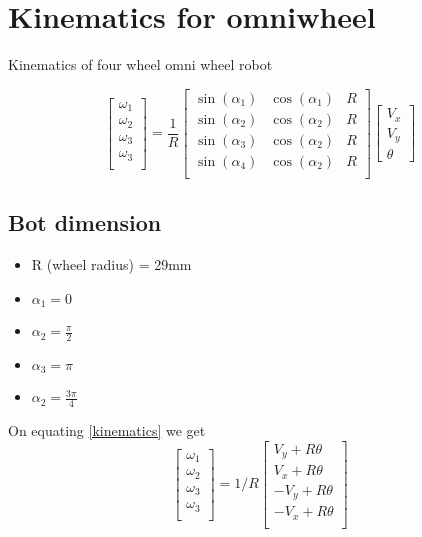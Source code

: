 \documentclass[a4paper]{article}
\begin{document}

\section{Kinematics for omniwheel }
Kinematics of four wheel omni wheel robot

\begin{equation}\label{kinematics}   
    \begin{bmatrix}
		\omega_1 \\
		\omega_2 \\
		\omega_3 \\
		\omega_3 \\
	\end{bmatrix}
	=\frac{1}{R}
	\begin{bmatrix}
		\sin(\alpha_1) & \cos(\alpha_1) & R \\
		\sin(\alpha_2) & \cos(\alpha_2) & R \\
		\sin(\alpha_3) & \cos(\alpha_2) & R \\
		\sin(\alpha_4) & \cos(\alpha_2) & R \\
	\end{bmatrix}
	\begin{bmatrix}
		V_x \\
		V_y \\
		\theta
	\end{bmatrix}
\end{equation}
\subsection{Bot dimension}
\begin{itemize}
	\item R (wheel radius) = 29mm
	\item $\alpha_1 = 0 $
	\item $\alpha_2 = \frac{\pi}{2} $
	\item $\alpha_3 = \pi $
	\item $\alpha_2 = \frac{3\pi}{4} $
\end{itemize}
On equating \ref{kinematics} we get
\begin{equation}
	\begin{bmatrix}
		\omega_1 \\
		\omega_2 \\
		\omega_3 \\
		\omega_3 \\
	\end{bmatrix}
	= 1/R \begin{bmatrix}
		V_y + R \theta  \\
		V_x + R \theta  \\
		-V_y + R \theta \\
		-V_x + R \theta \\
	\end{bmatrix}
\end{equation}

\end{document}
